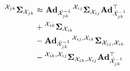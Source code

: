 \begin{align}
  \prescript{\cX_{jk}}{}{\matSigma}_{\cX_{jk}} &\approx \mAd_{\bar{\cX}_{jk}^{-1}} \prescript{\cX_{ij}}{}{\matSigma_{\cX_{ij}}} \mAd_{\bar{\cX}_{jk}^{-1}}\trans\\
    &+ \prescript{\cX_{ik}}{}{\matSigma_{\cX_{ik}}}\\
    &- \mAd_{\bar{\cX}_{jk}^{-1}} \prescript{\cX_{ij}, \cX_{ik}}{}{\matSigma_{\cX_{ij}, \cX_{ik}}}\\
    &- \prescript{\cX_{ik}, \cX_{ij}}{}{\matSigma_{\cX_{ik}, \cX_{ij}}} \mAd_{\bar{\cX}_{jk}^{-1}}\trans
\end{align}